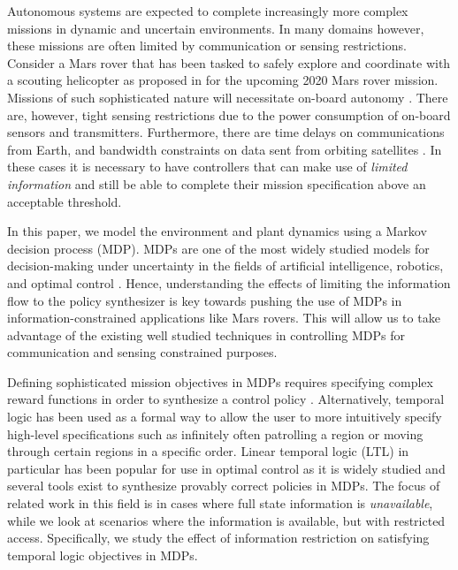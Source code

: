 Autonomous systems are expected to complete increasingly more complex missions in dynamic and uncertain environments. In many domains however, these missions are often limited by communication or sensing restrictions. Consider a Mars rover that has been tasked to safely explore and coordinate with a scouting helicopter as proposed in \cite{landau2015helicopter} for the upcoming 2020 Mars rover mission. Missions of such sophisticated nature will necessitate on-board autonomy \cite{francis2017advanced,estlin2007increased}. There are, however, tight sensing restrictions due to the power consumption of on-board sensors and transmitters. Furthermore, there are time delays on communications from Earth, and bandwidth constraints on data sent from orbiting satellites \cite{sherwood2014,Backes1999}. In these cases it is necessary to have controllers that can make use of \emph{limited information} and still be able to complete their mission specification above an acceptable threshold. %

In this paper, we model the environment and plant dynamics using a Markov decision process (MDP). MDPs are one of the most widely studied models for decision-making under uncertainty in the fields of artificial intelligence, robotics, and optimal control \cite{Papadimitriou87,Fu15}. Hence, understanding the effects of limiting the information flow to the policy synthesizer is key towards pushing the use of MDPs in information-constrained applications like Mars rovers. This will allow us to take advantage of the existing well studied techniques in controlling MDPs for communication and sensing constrained purposes. 

Defining sophisticated mission objectives in MDPs requires specifying complex reward functions in order to synthesize a control policy \cite{puterman2014}. Alternatively, temporal logic has been used as a formal way to allow the user to more intuitively specify high-level specifications such as infinitely often patrolling a region or moving through certain regions in a specific order. Linear temporal logic (LTL) in particular has been popular for use in optimal control \cite{Svoreňová13,Fu15} as it is widely studied and several tools exist to synthesize provably correct policies in MDPs. %
The focus of related work in this field is in cases where full state information is \emph{unavailable}, while we look at scenarios where the information is available, but with restricted access. Specifically, we study the effect of information restriction on satisfying temporal logic objectives in MDPs.

